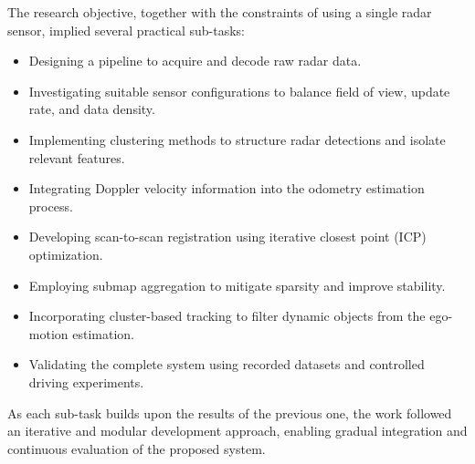 The research objective, together with the constraints of using a single radar sensor, implied several practical sub-tasks:  
\begin{itemize}
    \item Designing a pipeline to acquire and decode raw radar data.  
    \item Investigating suitable sensor configurations to balance field of view, update rate, and data density.  
    \item Implementing clustering methods to structure radar detections and isolate relevant features.  
    \item Integrating Doppler velocity information into the odometry estimation process.  
    \item Developing scan-to-scan registration using iterative closest point (ICP) optimization.  
    \item Employing submap aggregation to mitigate sparsity and improve stability.  
    \item Incorporating cluster-based tracking to filter dynamic objects from the ego-motion estimation.  
    \item Validating the complete system using recorded datasets and controlled driving experiments.  
\end{itemize}

As each sub-task builds upon the results of the previous one, the work followed an iterative and modular development approach, enabling gradual integration and continuous evaluation of the proposed system.  
